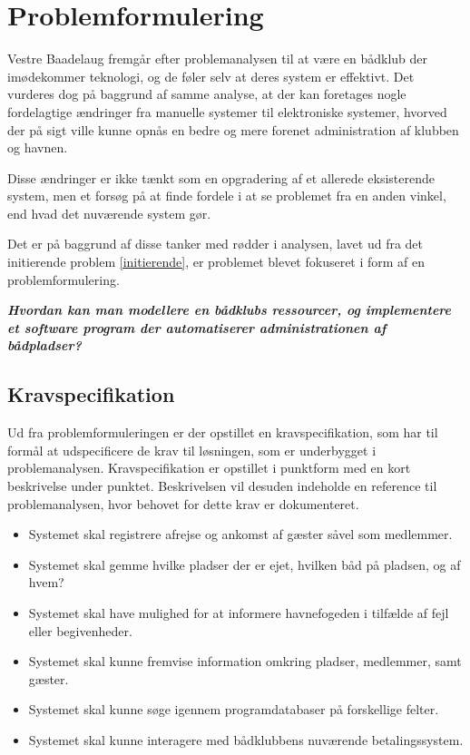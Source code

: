 \chapter{Problemformulering}
\label{cha:problemformulering}

Vestre Baadelaug fremgår efter problemanalysen til at være en bådklub der imødekommer teknologi, og de føler selv at deres system er effektivt. Det vurderes dog på baggrund af samme analyse, at der kan foretages nogle fordelagtige ændringer fra manuelle systemer til elektroniske systemer, hvorved der på sigt ville kunne opnås en bedre og mere forenet administration af klubben og havnen.

Disse ændringer er ikke tænkt som en opgradering af et allerede eksisterende system, men et forsøg på at finde fordele i at se problemet fra en anden vinkel, end hvad det nuværende system gør.

Det er på baggrund af disse tanker med rødder i analysen, lavet ud fra det initierende problem \ref{initierende}, er problemet blevet fokuseret i form af en problemformulering. 


\begin{displayquote}
	\textbf{\textit{Hvordan kan man modellere en bådklubs ressourcer, og implementere et software program der automatiserer administrationen af bådpladser?}}
\end{displayquote}

\section{Kravspecifikation} %
\label{sec:Kravspecifikation}

Ud fra problemformuleringen er der opstillet en kravspecifikation, som har til
formål at udspecificere de krav til løsningen, som er underbygget i problemanalysen. 
Kravspecifikation er opstillet i punktform med en kort beskrivelse 
under punktet. Beskrivelsen vil desuden indeholde en reference til problemanalysen, hvor 
behovet for dette krav er dokumenteret.
 

\begin{itemize}
  \item Systemet skal registrere afrejse og ankomst af gæster såvel som medlemmer.
  \item Systemet skal gemme hvilke pladser der er ejet, hvilken båd på pladsen, og af hvem?
  \item Systemet skal have mulighed for at informere havnefogeden i tilfælde af fejl eller begivenheder.
  \item Systemet skal kunne fremvise information omkring pladser, medlemmer, samt gæster.
  \item Systemet skal kunne søge igennem programdatabaser på forskellige felter.	
  \item Systemet skal kunne interagere med bådklubbens nuværende betalingssystem.
\end{itemize}

